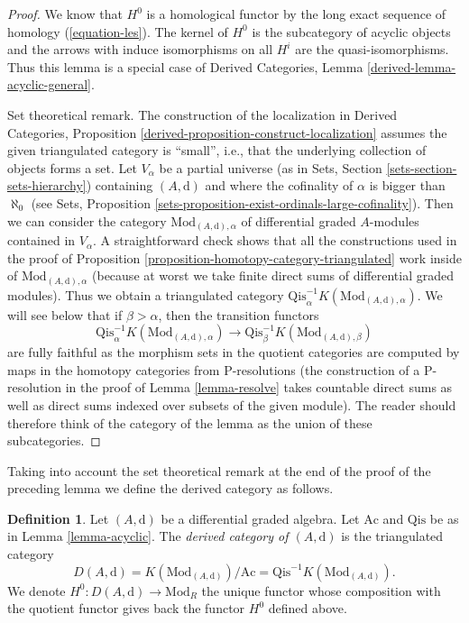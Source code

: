 \documentclass{stacks-project}
\theoremstyle{plain}
\theoremstyle{definition}
\newtheorem{definition}[subsection]{Definition}
\theoremstyle{remark}
\numberwithin{equation}{subsection}
\begin{document}
\begin{proof}
We know that $H^0$ is a homological functor by the long exact
sequence of homology (\ref{equation-les}).
The kernel of $H^0$ is the subcategory of acyclic objects and
the arrows with induce isomorphisms on all $H^i$ are the
quasi-isomorphisms. Thus this lemma is a special case of
Derived Categories, Lemma \ref{derived-lemma-acyclic-general}.

\medskip\noindent
Set theoretical remark. The construction of the localization in
Derived Categories, Proposition
\ref{derived-proposition-construct-localization}
assumes the given triangulated category is ``small'', i.e., that the
underlying collection of objects forms a set. Let $V_\alpha$ be a
partial universe (as in Sets, Section \ref{sets-section-sets-hierarchy})
containing $(A, \text{d})$ and where the cofinality of $\alpha$
is bigger than $\aleph_0$
(see Sets, Proposition \ref{sets-proposition-exist-ordinals-large-cofinality}).
Then we can consider the category $\text{Mod}_{(A, \text{d}), \alpha}$
of differential graded $A$-modules contained in $V_\alpha$.
A straightforward check shows that all the constructions used in
the proof of Proposition \ref{proposition-homotopy-category-triangulated}
work inside of $\text{Mod}_{(A, \text{d}), \alpha}$
(because at worst we take finite direct sums of differential graded modules).
Thus we obtain a triangulated category
$\text{Qis}_\alpha^{-1}K(\text{Mod}_{(A, \text{d}), \alpha})$.
We will see below that if $\beta > \alpha$, then the transition functors
$$
\text{Qis}_\alpha^{-1}K(\text{Mod}_{(A, \text{d}), \alpha})
\longrightarrow
\text{Qis}_\beta^{-1}K(\text{Mod}_{(A, \text{d}), \beta})
$$
are fully faithful as the morphism sets in the quotient categories
are computed by maps in the homotopy categories from P-resolutions
(the construction of a P-resolution in the proof of Lemma \ref{lemma-resolve}
takes countable direct sums as well as direct sums indexed over subsets
of the given module). The reader should therefore think of the category
of the lemma as the union of these subcategories.
\end{proof}

\noindent
Taking into account the set theoretical remark at the end of the
proof of the preceding lemma we define the derived category as follows.

\begin{definition}
\label{definition-unbounded-derived-category}
Let $(A, \text{d})$ be a differential graded algebra.
Let $\text{Ac}$ and $\text{Qis}$ be as in Lemma \ref{lemma-acyclic}.
The {\it derived category of $(A, \text{d})$} is the triangulated
category
$$
D(A, \text{d}) =
K(\text{Mod}_{(A, \text{d})})/\text{Ac} =
\text{Qis}^{-1}K(\text{Mod}_{(A, \text{d})}).
$$
We denote $H^0 : D(A, \text{d}) \to \text{Mod}_R$ the unique functor
whose composition with the quotient functor gives back the functor
$H^0$ defined above.
\end{definition}
\end{document}
